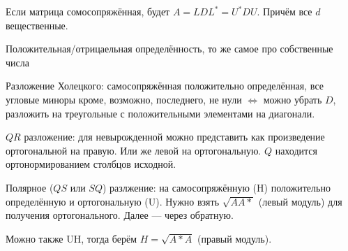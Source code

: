 \documentclass[12pt, a4paper]{article}
\begin{document}
    Если матрица сомосопряжённая, будет $A = LDL^* = U^*DU$. Причём все $d$ вещественные.

    Положительная/отрицаельная определённость, то же самое про собственные числа

    Разложение Холецкого: самосопряжённая положительно определённая, все угловые миноры кроме, возможно, последнего, не нули $\Longleftrightarrow$ можно убрать $D$, 
    разложить на треугольные с положительными элементами на диагонали.

    $QR$ разложение: для невырожденной можно представить как произведение ортогональной на правую. Или же левой на ортогональную.
    $Q$ находится ортонормированием столбцов исходной.

    Полярное ($QS$ или $SQ$) разлжение: на самосопряжённую (H) положительно определённую и ортогональную (U). 
    Нужно взять $\sqrt{AA*}$ (левый модуль) для получения ортогонального. Далее — через обратную.

    Можно также UH, тогда берём $H = \sqrt{A*A}$ (правый модуль).
\end{document}
